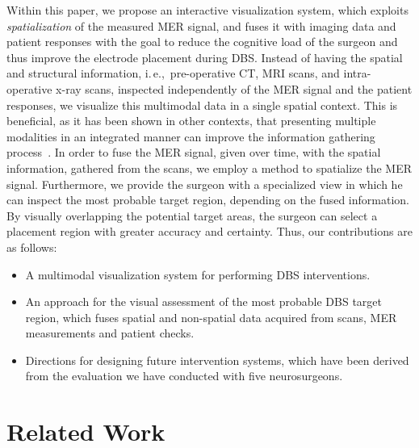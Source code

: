 \documentclass[journal]{vgtc}                %
\begin{document}
Within this paper, we propose an interactive visualization system, which exploits {\it spatialization} of the measured MER signal, and fuses it with imaging data and patient responses with the goal to reduce the cognitive load of the surgeon and thus improve the electrode placement during DBS. Instead of having the spatial and structural information, i.\,e.,~pre-operative CT, MRI scans, and intra-operative x-ray scans, inspected independently of the MER signal and the patient responses, we visualize this multimodal data in a single spatial context. This is beneficial, as it has been shown in other contexts, that presenting multiple modalities in an integrated manner can improve the information gathering process~\cite{10.1109/BIOMEDVIS.1995.10008}. In order to fuse the MER signal, given over time, with the spatial information, gathered from the scans, we employ a method to spatialize the MER signal. Furthermore, we provide the surgeon with a specialized view in which he can inspect the most probable target region, depending on the fused information. By visually overlapping the potential target areas, the surgeon can select a placement region with greater accuracy and certainty. Thus, our contributions are as follows:

\begin{itemize}
\item{A multimodal visualization system for performing DBS interventions.}
\item{An approach for the visual assessment of the most probable DBS target region, which fuses spatial and non-spatial data acquired from scans, MER measurements and patient checks.}
\item{Directions for designing future intervention systems, which have been derived from the evaluation we have conducted with five neurosurgeons.}
\end{itemize}



\section{Related Work}\label{sec:related}
\end{document}
